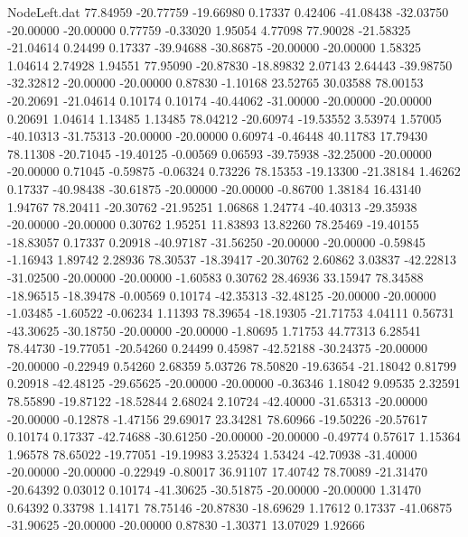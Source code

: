 \begin{filecontents}{NodeLeft.dat}
  77.84959  -20.77759  -19.66980     0.17337    0.42406  -41.08438  -32.03750  -20.00000  -20.00000    0.77759   -0.33020    1.95054    4.77098
  77.90028  -21.58325  -21.04614     0.24499    0.17337  -39.94688  -30.86875  -20.00000  -20.00000    1.58325    1.04614    2.74928    1.94551
  77.95090  -20.87830  -18.89832     2.07143    2.64443  -39.98750  -32.32812  -20.00000  -20.00000    0.87830   -1.10168   23.52765   30.03588
  78.00153  -20.20691  -21.04614     0.10174    0.10174  -40.44062  -31.00000  -20.00000  -20.00000    0.20691    1.04614    1.13485    1.13485
  78.04212  -20.60974  -19.53552     3.53974    1.57005  -40.10313  -31.75313  -20.00000  -20.00000    0.60974   -0.46448   40.11783   17.79430
  78.11308  -20.71045  -19.40125    -0.00569    0.06593  -39.75938  -32.25000  -20.00000  -20.00000    0.71045   -0.59875   -0.06324    0.73226
  78.15353  -19.13300  -21.38184     1.46262    0.17337  -40.98438  -30.61875  -20.00000  -20.00000   -0.86700    1.38184   16.43140    1.94767
  78.20411  -20.30762  -21.95251     1.06868    1.24774  -40.40313  -29.35938  -20.00000  -20.00000    0.30762    1.95251   11.83893   13.82260
  78.25469  -19.40155  -18.83057     0.17337    0.20918  -40.97187  -31.56250  -20.00000  -20.00000   -0.59845   -1.16943    1.89742    2.28936
  78.30537  -18.39417  -20.30762     2.60862    3.03837  -42.22813  -31.02500  -20.00000  -20.00000   -1.60583    0.30762   28.46936   33.15947
  78.34588  -18.96515  -18.39478    -0.00569    0.10174  -42.35313  -32.48125  -20.00000  -20.00000   -1.03485   -1.60522   -0.06234    1.11393
  78.39654  -18.19305  -21.71753     4.04111    0.56731  -43.30625  -30.18750  -20.00000  -20.00000   -1.80695    1.71753   44.77313    6.28541
  78.44730  -19.77051  -20.54260     0.24499    0.45987  -42.52188  -30.24375  -20.00000  -20.00000   -0.22949    0.54260    2.68359    5.03726
  78.50820  -19.63654  -21.18042     0.81799    0.20918  -42.48125  -29.65625  -20.00000  -20.00000   -0.36346    1.18042    9.09535    2.32591
  78.55890  -19.87122  -18.52844     2.68024    2.10724  -42.40000  -31.65313  -20.00000  -20.00000   -0.12878   -1.47156   29.69017   23.34281
  78.60966  -19.50226  -20.57617     0.10174    0.17337  -42.74688  -30.61250  -20.00000  -20.00000   -0.49774    0.57617    1.15364    1.96578
  78.65022  -19.77051  -19.19983     3.25324    1.53424  -42.70938  -31.40000  -20.00000  -20.00000   -0.22949   -0.80017   36.91107   17.40742
  78.70089  -21.31470  -20.64392     0.03012    0.10174  -41.30625  -30.51875  -20.00000  -20.00000    1.31470    0.64392    0.33798    1.14171
  78.75146  -20.87830  -18.69629     1.17612    0.17337  -41.06875  -31.90625  -20.00000  -20.00000    0.87830   -1.30371   13.07029    1.92666

\end{filecontents}
